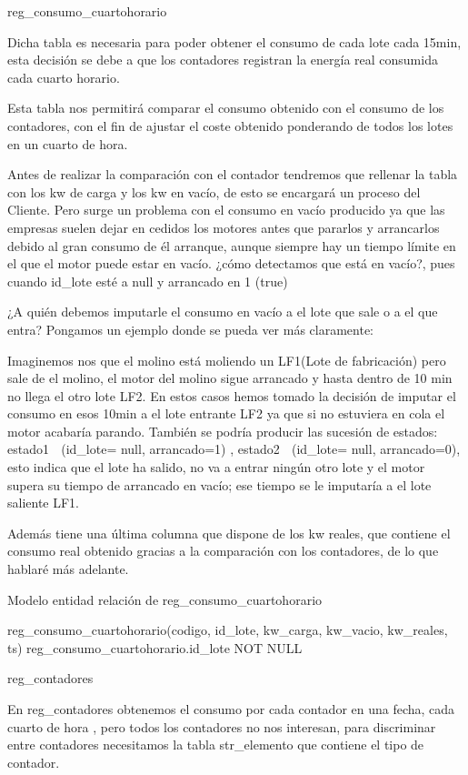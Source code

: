 reg_consumo_cuartohorario

Dicha tabla es necesaria para poder obtener el consumo de cada lote cada 15min, esta 
decisión se debe a que los contadores registran la energía real consumida cada cuarto horario.

Esta tabla nos permitirá comparar el consumo obtenido con el consumo de los contadores, 
con el fin de ajustar el coste obtenido ponderando de todos los lotes en un cuarto de hora.

Antes de realizar la comparación con el contador tendremos que rellenar la tabla con
 los kw de carga y los kw en vacío, de esto se encargará un proceso del Cliente. Pero
 surge un problema con el consumo en vacío producido ya que las empresas suelen 
dejar en cedidos los motores antes que pararlos y arrancarlos debido al gran consumo
 de él arranque, aunque siempre hay un tiempo límite en el que el motor puede estar
 en vacío. ¿cómo detectamos que está en vacío?, pues cuando id_lote esté a null y 
arrancado en 1 (true)

¿A quién debemos imputarle el consumo en vacío a el lote que sale o a el que entra?
 Pongamos un ejemplo donde se pueda ver más claramente:

Imaginemos nos que el molino está moliendo un LF1(Lote de fabricación) pero sale de
 el molino, el motor del molino sigue arrancado y hasta dentro de 10 min no llega el otro
 lote LF2. En estos casos hemos tomado la decisión de imputar el consumo en esos 10min
 a el lote entrante LF2 ya que si no estuviera en cola el motor acabaría parando.
 También se podría producir las sucesión de estados: estado1   (id_lote= null, arrancado=1) ,
 estado2  (id_lote= null, arrancado=0), esto indica que el lote ha salido, no va a entrar ningún 
otro lote y el motor supera su tiempo de arrancado en vacío; ese tiempo se le imputaría
 a el lote saliente LF1.

Además tiene una última columna que dispone de los kw reales, que contiene el consumo
 real obtenido gracias a la comparación con los contadores, de lo que hablaré más adelante.

Modelo entidad relación de reg_consumo_cuartohorario

reg_consumo_cuartohorario(codigo, id_lote, kw_carga, kw_vacio, kw_reales, ts)
reg_consumo_cuartohorario.id_lote NOT NULL

reg_contadores

En reg_contadores obtenemos el consumo por cada contador en una fecha, cada cuarto de hora
, pero todos los contadores no nos interesan, para discriminar entre contadores necesitamos la
 tabla str_elemento que contiene el tipo de contador.

